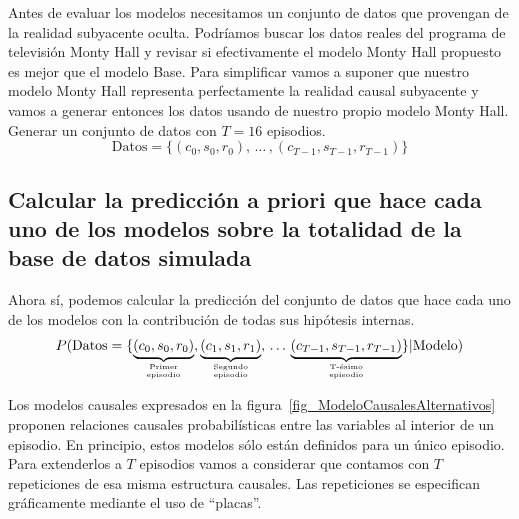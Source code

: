 \documentclass[a4paper,10pt]{article}
\begin{document}
Antes de evaluar los modelos necesitamos un conjunto de datos que provengan de la realidad subyacente oculta.
Podríamos buscar los datos reales del programa de televisión Monty Hall y revisar si efectivamente el modelo Monty Hall propuesto es mejor que el modelo Base. Para simplificar vamos a suponer que nuestro modelo Monty Hall representa perfectamente la realidad causal subyacente y vamos a generar entonces los datos usando de nuestro propio modelo Monty Hall.
Generar un conjunto de datos con $T=16$ episodios.
$$ \text{Datos} = \{(c_0, s_0, r_0), \,  \dots  \, , (c_{T-1}, s_{T-1}, r_{T-1}) \} $$

\subsection{Calcular la predicción a priori que hace cada uno de los modelos sobre la totalidad de la base de datos simulada}

Ahora sí, podemos calcular la predicción del conjunto de datos que hace cada uno de los modelos con la contribución de todas sus hipótesis internas.
$$P(\text{Datos} = \{\underbrace{(c_0, s_0, r_0)}_{\genfrac{}{}{0pt}{}{\text{Primer}}{\text{episodio}}}, \underbrace{(c_1, s_1, r_1)}_{\genfrac{}{}{0pt}{}{\text{Segundo}}{\text{episodio}}},  \,  \dots \, \underbrace{(c_{T-1}, s_{T-1}, r_{T-1})}_{\genfrac{}{}{0pt}{}{\text{T-ésimo}}{\text{episodio}}}  \}|\text{Modelo})$$

Los modelos causales expresados en la figura~\ref{fig_ModeloCausalesAlternativos} proponen relaciones causales probabilísticas entre las variables al interior de un episodio.
En principio, estos modelos sólo están definidos para un único episodio.
Para extenderlos a $T$ episodios vamos a considerar que contamos con $T$ repeticiones de esa misma estructura causales.
Las repeticiones se especifican gráficamente mediante el uso de ``placas''.
\end{document}

